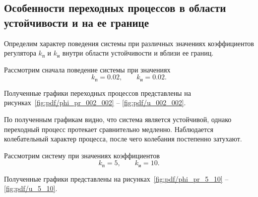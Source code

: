 \subsection{Особенности переходных процессов в области устойчивости и на ее границе}

Определим характер поведения системы при различных значениях коэффициентов регулятора $k_{\text{п}}$ и $k_{\text{и}}$ внутри области устойчивости и вблизи ее границ.

Рассмотрим сначала поведение системы при значениях
\begin{equation}
k_{\text{п}} = 0.02,
\qquad
k_{\text{и}} = 0.02.
\end{equation}

Полученные графики переходных процессов представлены на рисунках~\ref{fig:pdf/phi_pr_002_002} -- \ref{fig:pdf/u_002_002}.





По полученным графикам видно, что система является устойчивой, однако переходный процесс протекает сравнительно медленно. Наблюдается колебательный характер процесса, после чего колебания постепенно затухают.

Рассмотрим систему при значениях коэффициентов
\begin{equation}
k_{\text{п}} = 5,
\qquad
k_{\text{и}} = 10.
\end{equation}

Полученные графики представлены на рисунках~\ref{fig:pdf/phi_pr_5_10} -- \ref{fig:pdf/u_5_10}.




